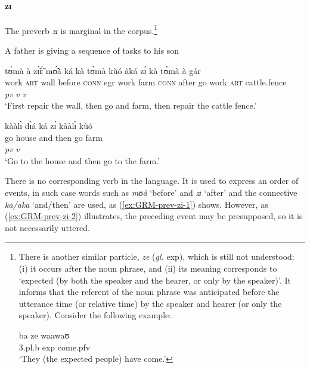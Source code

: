 \begin{exe}
\begin{exe}
\begin{exe}
{\begin{exe}
\begin{exe}
\begin{exe}
\begin{exe}
\begin{exe}
\begin{exe}
\begin{exe}
\begin{xlist}
\begin{exe}
\begin{exe}
\begin{exe}
\begin{exe}
\begin{exe}
\begin{exe}
\begin{exe}
\begin{exe}
\begin{exe}
\begin{exe}
\begin{exe}
\begin{exe}
\begin{exe}
\begin{exe}
\paragraph{zɪ}
\label{sec:GRM-preverb-after-then}

The preverb {\it zɪ} is marginal in the corpus.\footnote{There is another
similar particle, {\it ze}  ({\it gl.} {\sc exp}),  which is still not
understood: (i) it occurs after the noun phrase, and  (ii) its meaning
corresponds to
 `expected (by both the speaker and the
hearer, or only by the speaker)'. It informs that the referent of
the noun phrase was anticipated before the utterance time (or relative time) by
the speaker and hearer (or only the speaker).  Consider  the following
example:

\ea\gll ba ze  waawaʊ \\
{\sc 3.pl.b} {\sc  exp} come.{\sc pfv}\\
`They (the expected people) have come.'
\z
}  



\ea
\ea\label{ex:GRM-prev-zi-1}  {\rm A father is giving a sequence of tasks to
his son}

 \glll tʊ̀mà  à  zɪ̃́ɛ̃́  mʊ̃́ã̀  ká  kà  tʊ̀mà  kùó   àká   zɪ́ kà  
tʊ̀mà à  gár  \\
  {work} \textsc{art}    {wall} {before}  \textsc{conn} {\sc egr}    {work}
{farm} 
\textsc{conn} {after}  {go} {work} \textsc{art} {cattle.fence}\\  
{} {} {} {} {}  {} {} {} {} {\it pv} {\it v} {\it v} {} {}\\
\glt  `First repair the wall, then go and farm, then repair the cattle fence.'


 \ex\label{ex:GRM-prev-zi-2}
  \glll kààlɪ̀ dɪ̀á ká zɪ́ kààlɪ̀ kùó\\
go  house and then go farm\\
{} {} {}  {\it pv} {\it v} {}\\
 \glt `Go to the house and then go to the farm.'


\z 
 \z



There is no corresponding
verb in the language.   It is used to express an order of events,  
in such case words such as {\it mʊã}  
`before' and 
{\it zɪ} `after' and the connective {\it ka/aka}  `and/then'
are used, as (\ref{ex:GRM-prev-zi-1}) shows. However,  as
(\ref{ex:GRM-prev-zi-2}) illustrates,  the preceding event may be presupposed, 
so  it is not necessarily uttered.








\end{exe}
\end{exe}
\end{exe}
\end{exe}
\end{exe}
\end{exe}
\end{exe}
\end{exe}
\end{exe}
\end{exe}
\end{exe}
\end{exe}
\end{exe}
\end{exe}
\end{xlist}
\end{exe}
\end{exe}
\end{exe}
\end{exe}
\end{exe}
\end{exe}
\end{exe}}
\end{exe}
\end{exe}
\end{exe}

